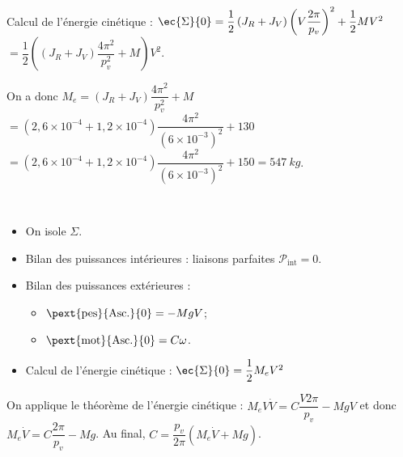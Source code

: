 \ifprof
\begin{corrige}~\\
Calcul de l'énergie cinétique : $\ec{\Sigma}{0} = \dfrac{1}{2}\left( J_R+J_V\right) \left(  V\dfrac{2\pi}{p_v}\right)^2+\dfrac{1}{2}MV^2$ $= \dfrac{1}{2}\left(\left( J_R+J_V\right) \dfrac{4\pi^2}{p_v^2} +M \right)V^2$.

On a donc $M_e = \left( J_R+J_V\right) \dfrac{4\pi^2}{p_v^2} +M$ $=\left( 2,6\times 10^{-4}+1,2\times 10^{-4}\right) \dfrac{4\pi^2}{\left( 6\times 10^{-3}\right)^2} +130$
$=\left( 2,6\times 10^{-4}+1,2\times 10^{-4}\right) \dfrac{4\pi^2}{\left( 6\times 10^{-3}\right)^2} +150 = \SI{547}{kg}$.
\end{corrige}
\else
\fi


\ifprof
\begin{corrige}~\\
\begin{itemize}
\item On isole $\Sigma$. 
\item Bilan des puissances intérieures : liaisons parfaites $\mathcal{P}_{\text{int}} = 0$.
\item Bilan des puissances extérieures : 
\begin{itemize}
\item $\pext{\text{pes}}{\text{Asc.}}{0}=-MgV$;
\item $\pext{\text{mot}}{\text{Asc.}}{0}=C\omega$.
\end{itemize}
\item Calcul de l'énergie cinétique : $\ec{\Sigma}{0} = \dfrac{1}{2}M_eV^2$
\end{itemize}
On applique le théorème de l'énergie cinétique : $M_e V \dot{V} =C\dfrac{V2\pi}{p_v} - MgV$ et donc 
$M_e \dot{V} =C\dfrac{2\pi}{p_v} - Mg$. Au final, $C = \dfrac{p_v}{2\pi}\left(M_e \dot{V} +Mg\right) $.
\end{corrige}
\else
\fi


